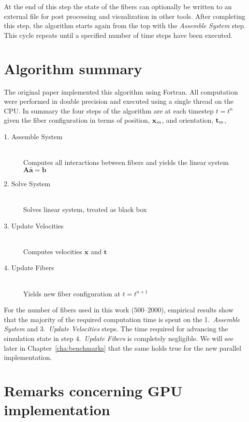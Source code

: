 At the end of this step the state of the fibers can optionally be written to an external file for post processing and visualization in other tools. After completing this step, the algorithm starts again from the top with the \emph{Assemble System} step. This cycle repeats until a specified number of time steps have been executed.

\section{Algorithm summary}
\label{sec:algorithm_summary}

The original paper implemented this algorithm using Fortran. All computation were performed in double precision and executed using a single thread on the CPU. In summary the four steps of the algorithm are at each timestep $t=t^n$ given the fiber configuration in terms of position, $\mathbf{x}_m$, and orientation, $\mathbf{t}_m$, 
\begin{description}
  \item[1. Assemble System] \hfill \\
Computes all interactions between fibers and yields the linear system ${\mathbf{A}\mathbf{\bar{a}}=\mathbf{b}}$
  \item[2. Solve System]  \hfill \\
Solves linear system, treated as black box
  \item[3. Update Velocities] \hfill \\
Computes velocities $\mathbf{\dot{x}}$ and $\mathbf{\dot{t}}$
  \item[4. Update Fibers] \hfill \\
Yields new fiber configuration at $t=t^{n+1}$
\end{description}

For the number of fibers used in this work ($500–2000$), empirical results show that the majority of the required computation time is spent on the 1.~\emph{Assemble System} and 3.~\emph{Update Velocities} steps. The time required for advancing the simulation state in step 4.~\emph{Update Fibers} is completely negligible. We will see later in Chapter~\ref{cha:benchmarks} that the same holds true for the new parallel implementation.

\section{Remarks concerning GPU implementation}

